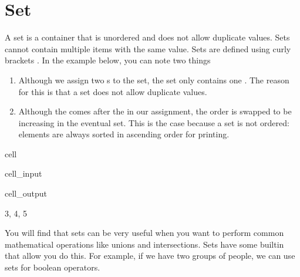 \documentclass[letterpaper,10pt,english]{jupyterBook}
\begin{document}
\section{Set}
\label{\detokenize{notebooks/02_Containers/02_Containers_student:set}}
\sphinxAtStartPar
A set is a container that is unordered and does not allow duplicate values. Sets cannot contain multiple items with the same value. Sets are defined using curly brackets \sphinxcode{\sphinxupquote{\{\}}}. In the example below, you can note two things
\begin{enumerate}
%
\item {} 
\sphinxAtStartPar
Although we assign two s to the set, the set only contains one . The reason for this is that a set does not allow duplicate values.

\item {} 
\sphinxAtStartPar
Although the  comes after the  in our assignment, the order is swapped to be increasing in the eventual set. This is the case because a set is not ordered: elements are always sorted in ascending order for printing.

\end{enumerate}

\begin{sphinxuseclass}{cell}\begin{sphinxVerbatimInput}

\begin{sphinxuseclass}{cell_input}
\begin{sphinxVerbatim}[commandchars=\\\{\}]
     
\end{sphinxVerbatim}

\end{sphinxuseclass}\end{sphinxVerbatimInput}
\begin{sphinxVerbatimOutput}

\begin{sphinxuseclass}{cell_output}
\begin{sphinxVerbatim}[commandchars=\\\{\}]
\PYGZob{}3, 4, 5\PYGZcb{}
\end{sphinxVerbatim}

\end{sphinxuseclass}\end{sphinxVerbatimOutput}

\end{sphinxuseclass}
\sphinxAtStartPar
You will find that sets can be very useful when you want to perform common mathematical operations like unions and intersections. Sets have some built\sphinxhyphen{}in  that allow you do this. For example, if we have two groups of people, we can use sets for boolean operators.
\end{document}
